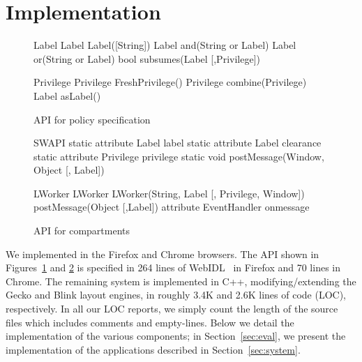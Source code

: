 \section{Implementation}
\label{sec:implementation}

\begin{figure}
{\small{
\begin{webidl}
Label {
  Label Label([String])
  Label and(String or Label)
  Label or(String or Label)
  bool subsumes(Label [,Privilege])
}
\end{webidl}
\begin{webidl}
Privilege {
  Privilege FreshPrivilege()
  Privilege combine(Privilege)
  Label asLabel()
}
\end{webidl}
}}
\vspace{-10pt}
\caption{\label{fig:APIspec} API for policy specification}
\vspace{-10pt}
\end{figure}


\begin{figure}
{\small
\begin{webidl}
SWAPI {
  static attribute Label label
  static attribute Label clearance 
  static attribute Privilege privilege
  static void postMessage(Window, Object 
                          [, Label])
}
\end{webidl}
\begin{webidl}
LWorker {
  LWorker LWorker(String, Label
                  [, Privilege, Window])
  postMessage(Object [,Label])
  attribute EventHandler onmessage
}
\end{webidl}
}
\vspace{-10pt}
\caption{\label{systemAPI} API for compartments}
\vspace{-10pt}
\end{figure}


We implemented \sys{} in the Firefox and Chrome browsers.
%
The API shown in Figures~\ref{fig:APIspec} and \ref{systemAPI} is specified in 264
lines of WebIDL~\cite{webidl} in Firefox and 70 lines in Chrome.
%
The remaining system is implemented in C++, modifying/extending the Gecko and
Blink layout engines, in roughly 3.4K and 2.6K lines of code (LOC),
respectively.
%
In all our LOC reports, we simply count the length of the source files which
includes comments and empty-lines.
%
Below we detail the implementation of the various \sys{} components;
in Section~\ref{sec:eval}, we present the implementation of the
applications described in Section~\ref{sec:system}.

